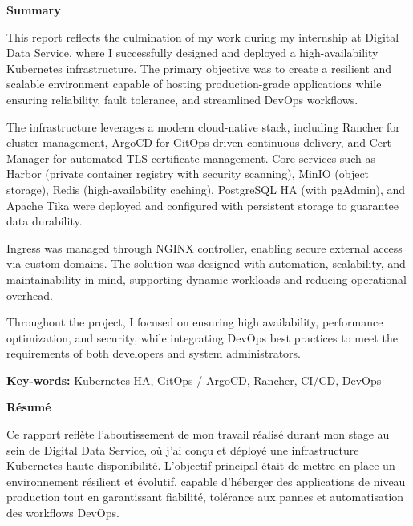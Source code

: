 \documentclass[a4paper,12pt]{report}
\begin{document}
\begin{center}
\vspace{9cm}
    \textbf{\huge{Summary}}
\end{center}

\begin{doublespace}
\vspace{1cm}
\large{
This report reflects the culmination of my work during my internship at Digital Data Service, where I successfully designed and deployed a high-availability Kubernetes infrastructure. The primary objective was to create a resilient and scalable environment capable of hosting production-grade applications while ensuring reliability, fault tolerance, and streamlined DevOps workflows.

The infrastructure leverages a modern cloud-native stack, including Rancher for cluster management, ArgoCD for GitOps-driven continuous delivery, and Cert-Manager for automated TLS certificate management. Core services such as Harbor (private container registry with security scanning), MinIO (object storage), Redis (high-availability caching), PostgreSQL HA (with pgAdmin), and Apache Tika were deployed and configured with persistent storage to guarantee data durability.

Ingress was managed through NGINX controller, enabling secure external access via custom domains. The solution was designed with automation, scalability, and maintainability in mind, supporting dynamic workloads and reducing operational overhead.

Throughout the project, I focused on ensuring high availability, performance optimization, and security, while integrating DevOps best practices to meet the requirements of both developers and system administrators.

\textbf{Key-words:} Kubernetes HA, GitOps / ArgoCD, Rancher, CI/CD, DevOps
}


\newpage
{}
{}

\begin{center}
\vspace{9cm}
    \textbf{\huge{Résumé}}
\end{center}

\begin{doublespace}
\vspace{1cm}
\large{
Ce rapport reflète l’aboutissement de mon travail réalisé durant mon stage au sein de Digital Data Service, où j’ai conçu et déployé une infrastructure Kubernetes haute disponibilité. L’objectif principal était de mettre en place un environnement résilient et évolutif, capable d’héberger des applications de niveau production tout en garantissant fiabilité, tolérance aux pannes et automatisation des workflows DevOps.

}
\end{doublespace}
\end{doublespace}
\end{document}
